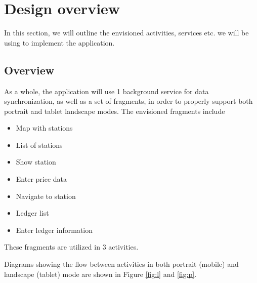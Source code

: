 
\chapter{Design overview}
In this section, we will outline the envisioned activities, services etc. we will be using to implement the application.

\section{Overview}
As a whole, the application will use 1 background service for data synchronization, as well as a set of fragments, in order to properly support both portrait and tablet landscape modes. The envisioned fragments include
\begin{itemize}
	\item Map with stations
	\item List of stations
	\item Show station
	\item Enter price data
	\item Navigate to station
	\item Ledger list
	\item Enter ledger information
\end{itemize}

These fragments are utilized in 3 activities. 

Diagrams showing the flow between activities in both portrait (mobile) and landscape (tablet) mode are shown in Figure \ref{fig:l} and \ref{fig:p}.

